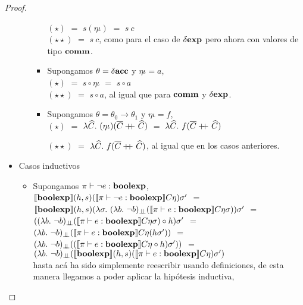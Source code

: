 \begin{proof}
\begin{itemize}
\begin{itemize}
\begin{itemize}
$(\star)$ $=$ $s(\eta\iota)$ $=$ $s \ c$\\

$(\star\star)$ $=$ $s \ c$, como para el caso de $\delta \textbf{exp}$ pero ahora con valores
de tipo $\textbf{comm}$.

\item Supongamos $\theta = \delta \textbf{acc}$ y $\eta\iota = a$,\\

$(\star)$ $=$ $s \circ \eta\iota$ $=$ $s \circ a$\\

$(\star\star)$ $=$ $s \circ a$, al igual que para $\textbf{comm}$ y $\delta \textbf{exp}$.

\item Supongamos $\theta = \theta_0 \rightarrow \theta_1$ y $\eta \iota = f$,\\

$(\star)$ $=$ $\lambda \widehat{C} . \ (\eta\iota)(\overline{C}\concat\widehat{C})$ $=$ 
$\lambda \widehat{C} . \ f(\overline{C}\concat\widehat{C})$

$(\star\star)$ $=$ $\lambda \widehat{C} . \ f(\overline{C}\concat\widehat{C})$, al igual
que en los casos anteriores.
\end{itemize}
\end{itemize}

\item Casos inductivos
\begin{itemize}
\item Supongamos $\pi \vdash \neg e : \textbf{boolexp}$,\\

$\llbracket \textbf{boolexp} \rrbracket(h,s)(\llbracket \pi \vdash \neg e : \textbf{boolexp} \rrbracket C\eta)\sigma'$ $=$\\
$\semBrcks{\boolexp}(h,s)(\lambda \sigma . \ 
 (\lambda b. \ \neg b)_{\dbot}(\semBrcks{\pi \vdash e : \boolexp}C\eta\sigma))\sigma'$ $=$\\
$((\lambda b. \ \neg b)_{\bot \!\!\! \bot}(\llbracket \pi \vdash e : \textbf{boolexp} \rrbracket C\eta\sigma) 
	\circ 
	h) \sigma'$ $=$ \\
$(\lambda b. \ \neg b)_{\bot \!\!\! \bot}(\llbracket \pi \vdash e : \textbf{boolexp} \rrbracket C\eta(h\sigma'))$ $=$\\
$(\lambda b. \ \neg b)_{\bot \!\!\! \bot}
	((\llbracket \pi \vdash e : \textbf{boolexp} \rrbracket C\eta \circ h)\sigma'))$ $=$\\
$(\lambda b. \ \neg b)_{\bot \!\!\! \bot}
	(\llbracket \textbf{boolexp} \rrbracket(h,s)(\llbracket \pi \vdash e : \textbf{boolexp} \rrbracket C\eta)\sigma')$\\
	
hasta ac\'a ha sido simplemente reescribir usando definiciones, de esta manera llegamos
a poder aplicar la hip\'otesis inductiva,\\


\end{itemize}
\end{itemize}
\end{proof}
